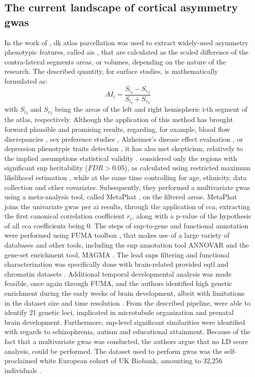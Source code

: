 \subsection{The current landscape of cortical asymmetry \ac{gwas}} 
 In the work of \citet{Sha2021}, \ac{dk} atlas parcellation was used to extract widely-used asymmetry phenotypic features, called \acfp{ai} \cite{Graham2022,Sarica2018,Kong2018,Savic2008,Zuo2019}, that are calculated as the scaled difference of the contra-lateral segments areas, or volumes, depending on the nature of the research. The described quantity, for surface studies, is mathematically formulated as:
$$
AI_i = \frac{{S_l}_i-{S_r}_i}{{S_l}_i+{S_r}_i}
$$
with ${S_l}_i$ and ${S_r}_i$ being the areas of the left and right hemispheric i-th segment of the atlas, respectively. Although the application of this method has brought forward plausible and promising results, regarding, for example, blood flow discrepancies \cite{Graham2022}, sex preference studies \cite{Savic2008}, Alzheimer's disease effect evaluation \cite{Sarica2018},  or depression phenotypic traits detection \cite{Zuo2019}, it has also met skepticism, relatively to the implied assumptions statistical validity \cite{Coles2008}. \citet{Sha2021} considered only the regions with significant \ac{snp} heritability ($FDR>0.05$), as calculated using restricted maximum likelihood estimation \cite{Yang2010}, while at the same time controlling for age, ethnicity, data collection and other covariates. Subsequently, they performed a multivariate \ac{gwas}  using a meta-analysis tool, called MetaPhat \cite{Lin2020}, on the filtered areas. MetaPhat joins the univariate \ac{gwas} per \ac{ai} results, through the application of \ac{cca}, extracting the first canonical correlation coefficient $r_i$, along with a p-value of the hypothesis of all \ac{cca} coefficients being 0. The steps of snp-to-gene and functional annotation were performed using FUMA toolbox \cite{Watanabe2017}, that makes use of a large variety of databases and other tools, including the \ac{snp} annotation tool ANNOVAR \cite{Wang2010} and  the gene-set enrichment tool, MAGMA \cite{DeLeeuw2015}. The lead \acp{snp} filtering and functional characterization was specifically done with brain-related provided \ac{eqtl} and chromatin datasets \cite{Sha2021}. Additional temporal developmental analysis was made feasible, once again through FUMA, and the authors identified high genetic enrichment during the early weeks of brain development, albeit with limitations in the dataset size and time resolution \cite{Kang2011}.  From the described pipeline, \citet{Sha2021} were able to identify 21 genetic loci, implicated in microtubule organization and prenatal brain development. Furthermore, \ac{snp}-level significant similarities were identified with regards to schizophrenia, autism and educational attainment\cite{Sha2021}. Because of the fact that a multivariate \ac{gwas} was conducted, the authors argue that no LD score analysis, could be performed. The dataset used to perform \ac{gwas} was the self-proclaimed white European cohort of UK Biobank, amounting to 32,256 individuals \cite{Bycroft2018}.

